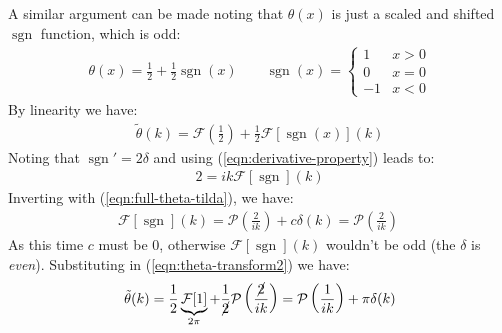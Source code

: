 \documentclass[../template.tex]{subfiles}
\begin{document}
A similar argument can be made noting that $\theta(x)$ is just a scaled and shifted $\operatorname{sgn}$ function, which is odd:
\begin{align*}
    \theta(x) = \frac{1}{2} +  \frac{1}{2}\operatorname{sgn}(x) \qquad
    \operatorname{sgn}(x) = \begin{cases}
        1 & x > 0\\
        0 & x = 0\\
        -1 & x < 0
    \end{cases} 
\end{align*} 
By linearity we have:
\begin{align}
    \tilde{\theta}(k) = \mathcal{F}\left(\frac{1}{2}\right) + \frac{1}{2} \mathcal{F}[\operatorname{sgn}(x)](k) \label{eqn:theta-transform2}
\end{align}
Noting that $\operatorname{sgn}' = 2 \delta$ and using (\ref{eqn:derivative-property}) leads to:
\begin{align*}
    2 = ik \mathcal{F}[\operatorname{sgn}](k)
\end{align*}
Inverting with (\ref{eqn:full-theta-tilda}), we have:
\begin{align*}
    \mathcal{F}[\operatorname{sgn}](k) = \mathcal{P}\left(\frac{2}{ik} \right) + c \delta(k) =\mathcal{P}\left(\frac{2}{ik} \right) \ 
\end{align*}
As this time $c$ must be $0$, otherwise $\mathcal{F}[\operatorname{sgn}](k)$ wouldn't be odd (the $\delta$ is \textit{even}). Substituting in (\ref{eqn:theta-transform2}) we have:
\begin{align*}
    \tilde{\theta}(k) = \frac{1}{2} \underbrace{\mathcal{F}[1] }_{2 \pi}+\frac{1}{\cancel{2}} \mathcal{P}\left(\frac{\cancel{2}}{ik} \right) = \mathcal{P}\left(\frac{1}{ik} \right)  + \pi \delta(k)
\end{align*}
\end{document}
